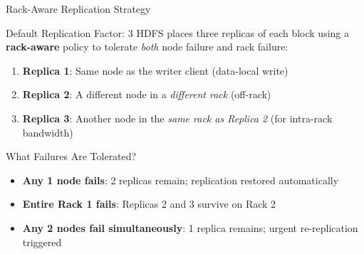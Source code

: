 \documentclass[aspectratio=169,10pt]{beamer}
\begin{document}
\begin{frame}{Rack-Aware Replication Strategy}
 
      \begin{block}{Default Replication Factor: 3}
        HDFS places three replicas of each block using a \textbf{rack-aware} policy to tolerate \emph{both} node failure and rack failure:
        \vspace{4pt}
        \begin{enumerate}
          \item \textbf{Replica 1}: Same node as the writer client (data-local write)
          \item \textbf{Replica 2}: A different node in a \emph{different rack} (off-rack)
          \item \textbf{Replica 3}: Another node in the \emph{same rack as Replica 2} (for intra-rack bandwidth)
        \end{enumerate}
      \end{block}
      \vspace{4pt}
      \begin{alertblock}{What Failures Are Tolerated?}
        \begin{itemize}
          \item \textbf{Any 1 node fails}: 2 replicas remain; replication restored automatically
          \item \textbf{Entire Rack 1 fails}: Replicas 2 and 3 survive on Rack 2
          \item \textbf{Any 2 nodes fail simultaneously}: 1 replica remains; urgent re-replication triggered
        \end{itemize}
      \end{alertblock}

    
\end{frame}
\end{document}
